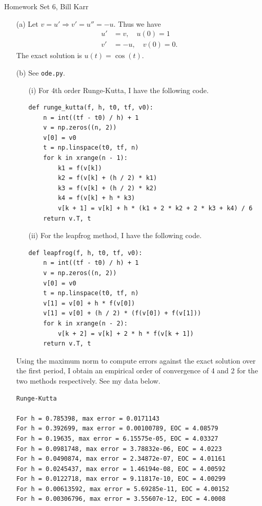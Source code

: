 \documentclass[10pt]{article}
\begin{document}
%
{Homework Set 6, Bill Karr}


\begin{itemize}

\item[(a)] Let $ v = u' \Rightarrow v' = u'' = - u $. Thus we have \begin{align*}
u' &=  v, \quad u(0) = 1 \\
v' &= - u, \quad v(0) = 0.
\end{align*} The exact solution is $ u(t) = \cos(t) $.

\item[(b)] See \verb+ode.py+.

\begin{itemize}

\item[(i)] For 4th order Runge-Kutta, I have the following code. \begin{lstlisting}
def runge_kutta(f, h, t0, tf, v0):
    n = int((tf - t0) / h) + 1
    v = np.zeros((n, 2))
    v[0] = v0
    t = np.linspace(t0, tf, n)
    for k in xrange(n - 1):
        k1 = f(v[k])
        k2 = f(v[k] + (h / 2) * k1)
        k3 = f(v[k] + (h / 2) * k2)
        k4 = f(v[k] + h * k3)
        v[k + 1] = v[k] + h * (k1 + 2 * k2 + 2 * k3 + k4) / 6
    return v.T, t
\end{lstlisting}

\item[(ii)] For the leapfrog method, I have the following code. \begin{lstlisting} 
def leapfrog(f, h, t0, tf, v0):
    n = int((tf - t0) / h) + 1
    v = np.zeros((n, 2))
    v[0] = v0
    t = np.linspace(t0, tf, n)
    v[1] = v[0] + h * f(v[0])
    v[1] = v[0] + (h / 2) * (f(v[0]) + f(v[1]))
    for k in xrange(n - 2):
        v[k + 2] = v[k] + 2 * h * f(v[k + 1])
    return v.T, t
\end{lstlisting}

\end{itemize} Using the maximum norm to compute errors against the exact solution over the first period, I obtain an empirical order of convergence of 4 and 2 for the two methods respectively. See my data below. \begin{verbatim}
Runge-Kutta

For h = 0.785398, max error = 0.0171143
For h = 0.392699, max error = 0.00100789, EOC = 4.08579
For h = 0.19635, max error = 6.15575e-05, EOC = 4.03327
For h = 0.0981748, max error = 3.78832e-06, EOC = 4.0223
For h = 0.0490874, max error = 2.34872e-07, EOC = 4.01161
For h = 0.0245437, max error = 1.46194e-08, EOC = 4.00592
For h = 0.0122718, max error = 9.11817e-10, EOC = 4.00299
For h = 0.00613592, max error = 5.69285e-11, EOC = 4.00152
For h = 0.00306796, max error = 3.55607e-12, EOC = 4.0008


\end{verbatim}
\end{itemize}
\end{document}

